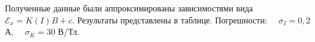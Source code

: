 \n
Полученные данные были аппроксимированы зависимостями вида $  \mathcal{E}_x=K(I)B+c $. Результаты представлены в таблице. Погрешности: $ \quad \sigma_{I} = 0,2$ А, $ \quad \sigma_{K} = 30$ В/Тл.

